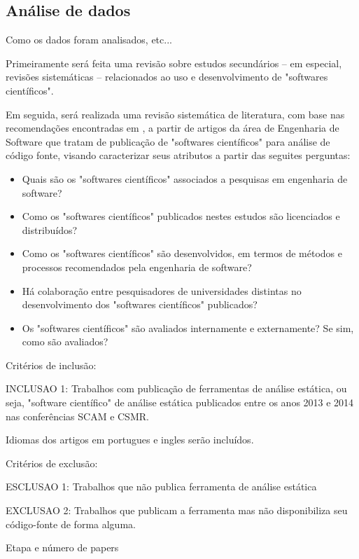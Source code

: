 \documentclass[12pt]{article}
\begin{document}
\subsection{Análise de dados}

Como os dados foram analisados, etc...

Primeiramente será feita uma revisão sobre estudos secundários -- em especial,
revisões sistemáticas -- relacionados ao uso e desenvolvimento de "softwares
científicos".

Em seguida, será realizada uma revisão sistemática de literatura, com base nas
recomendações encontradas em \cite{Kitchenham2007}, a partir de artigos da
área de Engenharia de Software que tratam de publicação de "softwares
científicos" para análise de código fonte, visando caracterizar seus atributos
a partir das seguites perguntas:

\begin{itemize}
  \item Quais são os "softwares científicos" associados a pesquisas em
    engenharia de software?
  \item Como os "softwares científicos" publicados nestes estudos são
    licenciados e distribuídos?
  \item Como os "softwares científicos" são desenvolvidos, em termos de
    métodos e processos recomendados pela engenharia de software?
  \item Há colaboração entre pesquisadores de universidades distintas no
    desenvolvimento dos "softwares científicos" publicados?
  \item Os "softwares científicos" são avaliados internamente e externamente?
    Se sim, como são avaliados?
\end{itemize}

Critérios de inclusão:

INCLUSAO 1: Trabalhos com publicação de ferramentas de análise
estática, ou seja, "software científico" de análise estática publicados entre
os anos 2013 e 2014 nas conferências SCAM e CSMR.

Idiomas dos artigos em portugues e ingles serão incluídos.

Critérios de exclusão:

ESCLUSAO 1: Trabalhos que não publica ferramenta de análise estática

EXCLUSAO 2: Trabalhos que publicam a ferramenta mas não
disponibiliza seu código-fonte de forma alguma.

Etapa e número de papers
\end{document}
